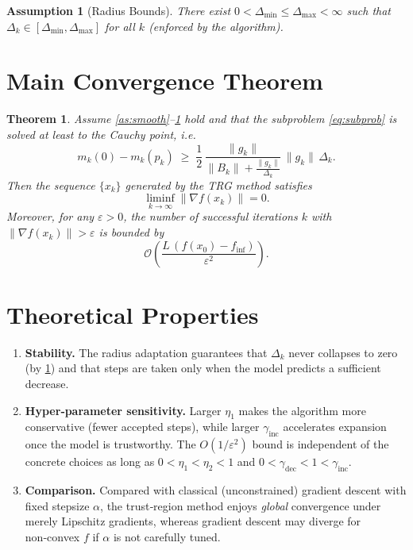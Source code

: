 \documentclass[11pt]{article}
\newtheorem{theorem}{Theorem}[section]
\newtheorem{assumption}{Assumption}[section]
\begin{document}
\begin{assumption}[Radius Bounds]
\label{as:radius}
There exist $0<\Delta_{\min}\le\Delta_{\max}<\infty$ such that
$\Delta_{k}\in[\Delta_{\min},\Delta_{\max}]$ for all $k$ (enforced by the algorithm).
\end{assumption}

\section*{Main Convergence Theorem}
\begin{theorem}
\label{thm:global}
Assume \ref{as:smooth}–\ref{as:radius} hold and that the subproblem \eqref{eq:subprob} is solved at least to the Cauchy point, i.e.
\[
m_{k}(0)-m_{k}(p_{k})\;\ge\;\frac{1}{2}\,\frac{\|g_{k}\|}{\|B_{k}\|+ \frac{\|g_{k}\|}{\Delta_{k}}}\,\|g_{k}\|\,\Delta_{k}.
\tag{Cauchy\;decrease}
\]
Then the sequence $\{x_{k}\}$ generated by the TRG method satisfies
\[
\liminf_{k\to\infty}\|\nabla f(x_{k})\|=0.
\]
Moreover, for any $\varepsilon>0$, the number of successful iterations $k$ with 
$\|\nabla f(x_{k})\|>\varepsilon$ is bounded by
\[
\mathcal{O}\!\left(\frac{L\,(f(x_{0})-f_{\inf})}{\varepsilon^{2}}\right).
\]
\end{theorem}

\section*{Theoretical Properties}
\begin{enumerate}[noitemsep]
\item \textbf{Stability.} The radius adaptation guarantees that $\Delta_{k}$ never collapses to zero (by \ref{as:radius}) and that steps are taken only when the model predicts a sufficient decrease.
\item \textbf{Hyper‑parameter sensitivity.} Larger $\eta_{1}$ makes the algorithm more conservative (fewer accepted steps), while larger $\gamma_{\text{inc}}$ accelerates expansion once the model is trustworthy. The $O(1/\varepsilon^{2})$ bound is independent of the concrete choices as long as $0<\eta_{1}<\eta_{2}<1$ and $0<\gamma_{\text{dec}}<1<\gamma_{\text{inc}}$.
\item \textbf{Comparison.} Compared with classical (unconstrained) gradient descent with fixed stepsize $\alpha$, the trust‑region method enjoys \emph{global} convergence under merely Lipschitz gradients, whereas gradient descent may diverge for non‑convex $f$ if $\alpha$ is not carefully tuned.
\end{enumerate}
\end{document}
